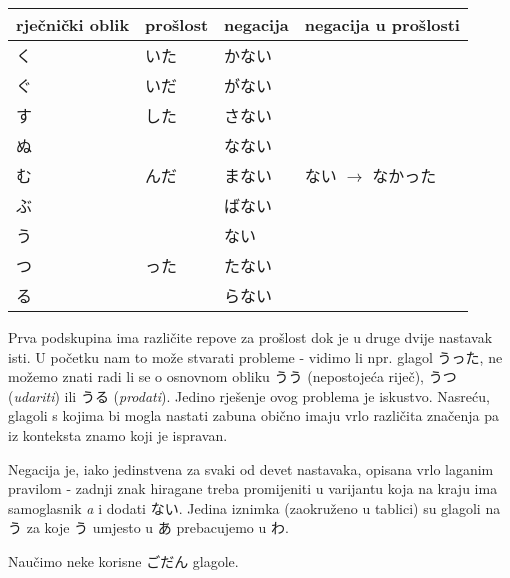 	\begin{table}[h]
		\centering
		\begin{tabular}{l l l l}\toprule[2pt]
			rječnički oblik & prošlost & negacija & negacija u prošlosti\\
			\midrule
			く & いた & かない & \multirow{9}{90pt}{ない $\rightarrow$ なかった}\\
			ぐ & いだ & がない & \\\vspace{5pt}
			す & した & さない & \\
			ぬ & \multirow{3}{30pt}{んだ} & なない & \\
			む & & まない & \\\vspace{5pt}
			ぶ & & ばない & \\
			う & \multirow{3}{30pt}{った} & \en{わ}\hspace{-2pt}ない & \\
			つ & & たない & \\
			る & & らない & \\
			\bottomrule[2pt]
		\end{tabular}
	\end{table}

	Prva podskupina ima različite repove za prošlost dok je u druge dvije nastavak isti. U početku nam to može stvarati probleme - vidimo li npr. glagol うった, ne možemo znati radi li se o osnovnom obliku うう (nepostojeća riječ), うつ (\textit{udariti}) ili うる (\textit{prodati}). Jedino rješenje ovog problema je iskustvo. Nasreću, glagoli s kojima bi mogla nastati zabuna obično imaju vrlo različita značenja pa iz konteksta znamo koji je ispravan.
	
	Negacija je, iako jedinstvena za svaki od devet nastavaka, opisana vrlo laganim pravilom - zadnji znak hiragane treba promijeniti u varijantu koja na kraju ima samoglasnik \textit{a} i dodati ない. Jedina iznimka (zaokruženo u tablici) su glagoli na う za koje う umjesto u あ prebacujemo u わ.
	
	Naučimo neke korisne ごだん glagole.
	
